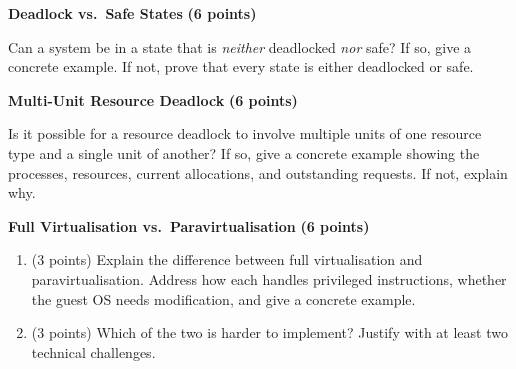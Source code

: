 \documentclass[10pt,answers]{exam}
\newcommand{\qpoints}[1]{\hfill \textbf{(#1 points)}}
\begin{document}
\begin{questions}

\question \textbf{Deadlock vs.\ Safe States} \qpoints{6}

Can a system be in a state that is \textit{neither} deadlocked \textit{nor} safe?
If so, give a concrete example.  If not, prove that every state is either deadlocked or safe.

\begin{solution}
\end{solution}


\question \textbf{Multi-Unit Resource Deadlock} \qpoints{6}

Is it possible for a resource deadlock to involve multiple units of one resource type and a single unit of another?
If so, give a concrete example showing the processes, resources, current allocations, and outstanding requests.  If not, explain why.

\begin{solution}
\end{solution}


\question \textbf{Full Virtualisation vs.\ Paravirtualisation} \qpoints{6}

\begin{enumerate}[label=(\alph*)]
  \item (3 points) Explain the difference between full virtualisation and paravirtualisation. Address how each handles privileged instructions, whether the guest OS needs modification, and give a concrete example.

    \begin{solution}
    \end{solution}

  \item (3 points) Which of the two is harder to implement? Justify with at least two technical challenges.

    \begin{solution}
    \end{solution}
\end{enumerate}



\end{questions}
\end{document}
